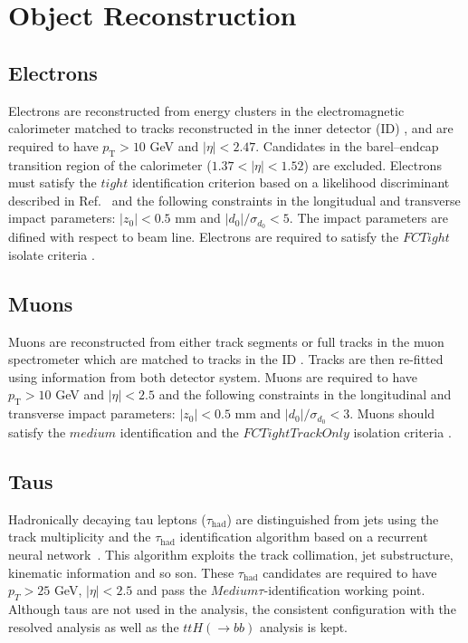 \section{Object Reconstruction}
\label{sec:ObjectReco}

\subsection{Electrons}
\label{subsec:Electrons}
Electrons are reconstructed from energy clusters in the electromagnetic calorimeter matched to tracks reconstructed in the inner detector (ID) \cite{PERF-2013-03,ATLAS-CONF-2016-024}, and are required to have $p_\text{T}>10$ GeV and $|\eta|<2.47$. Candidates in the barel--endcap transition region of the calorimeter ($1.37<|\eta|<1.52$) are excluded. Electrons must satisfy the $tight$ identification criterion based on a likelihood discriminant described in Ref.~\cite{ATLAS-CONF-2016-024} and the following constraints in the longitudual and transverse impact parameters: $|z_{0}|<0.5$ mm and $|d_{0}|/\sigma_{d_{0}}<5$. The impact parameters are difined with respect to beam line. Electrons are required to satisfy the $FCTight$ isolate criteria \cite{IsolationSelectionTool}.



\subsection{Muons}
\label{subsec:Muons}
Muons are reconstructed from either track segments or full tracks in the muon spectrometer which are matched to tracks in the ID \cite{PERF-2015-10}. Tracks are then re-fitted using information from both detector system. Muons are required to have $p_\text{T}>10$ GeV and $|\eta|<2.5$ and the following constraints in the longitudinal and transverse impact parameters: $|z_{0}|<0.5$ mm and $|d_{0}|/\sigma_{d_{0}}<3$. Muons should satisfy the $medium$ identification and the $FCTightTrackOnly$ isolation criteria \cite{IsolationSelectionTool}.



\subsection{Taus}
\label{subsec:Taus}
Hadronically decaying tau leptons ($\tau_{\text{had}}$) are distinguished from jets using the track multiplicity and the $\tau_\text{had}$ identification algorithm based on a recurrent neural network~\cite{ATL-PHYS-PUB-2015-045}. This algorithm exploits the track collimation, jet substructure, kinematic information and so son. These $\tau_{\text{had}}$ candidates are required to have $p_{T}>25$ GeV, $|\eta|<2.5$ and pass the $Medium \tau$-identification working point. Although taus are not used in the analysis, the consistent configuration with the resolved analysis as well as the $ttH(\to bb)$ analysis is kept.



